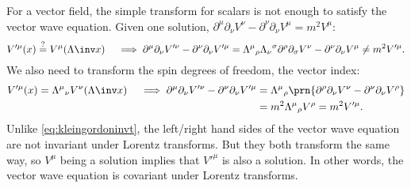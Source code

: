 \documentclass[11pt]{article}
\begin{document}
For a vector field, the simple transform for scalars is not enough to satisfy the  vector wave equation.
Given one solution, \(\partial^\mu \partial_\nu V^\nu - \partial^\nu \partial_\nu V^\mu = m^2 V^\mu\):
%
\begin{equation*}
  V'^\mu(x) \stackrel{?}{=} V^\mu(\Lambda\inv x)
  \quad\implies
  \partial^\mu \partial_\nu V'^\nu - \partial^\nu \partial_\nu V'^\mu 
    = \Lambda^\mu{}_\rho \Lambda_\nu{}^\sigma \partial^\rho \partial_\sigma V^\nu
      - \partial^\nu \partial_\nu V^\mu 
    \neq m^2 V'^\mu.
\end{equation*}
%
We also need to transform the spin degrees of freedom, \ie the vector index:
%
\begin{equation}\label{eq:vectorcovt}
\begin{aligned}
  V'^\mu(x) = \Lambda^\mu{}_\nu V^\nu(\Lambda\inv x)
  \quad\implies
  \partial^\mu \partial_\nu V'^\nu - \partial^\nu \partial_\nu V'^\mu 
    &= \Lambda^\mu{}_\rho \prn{\partial^\rho \partial_\nu V^\nu
      - \partial^\nu \partial_\nu V^\rho} \\
    &= m^2 \Lambda^\mu{}_\rho  V^\rho
    = m^2 V'^\mu.
\end{aligned}
\end{equation}
%
Unlike \cref{eq:kleingordoninvt}, the left/right hand sides of the vector wave equation are not invariant under Lorentz transforms.
But they both transform the same way, so \(V^\mu\) being a solution implies that \(V'^\mu\) is also a solution.
In other words, the vector wave equation is covariant under Lorentz transforms.
\end{document}
